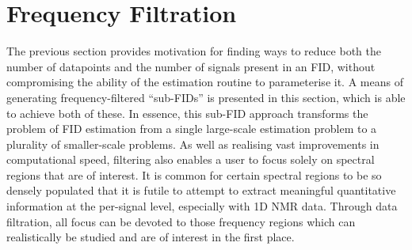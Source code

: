 \section{Frequency Filtration}
\label{sec:filtering}
The previous section provides motivation for finding ways to reduce both the
number of datapoints and the number of signals present in an \ac{FID},
without compromising the ability of the estimation routine
to parameterise it. A means of generating frequency-filtered ``sub-\acp{FID}''
is presented in this section, which is able to achieve both of these. In
essence, this sub-\ac{FID} approach transforms the problem of \ac{FID} estimation from a
single large-scale estimation problem to a plurality of smaller-scale problems.
As well as realising vast improvements in computational speed, filtering also
enables a user to focus solely on spectral regions that are of interest.
It is common for certain spectral regions to be so densely populated
that it is futile to attempt to extract meaningful quantitative information at
the per-signal level, especially with \ac{1D} \ac{NMR} data. Through data filtration,
all focus can be devoted to those frequency regions which can realistically be
studied and are of interest in the first place.

